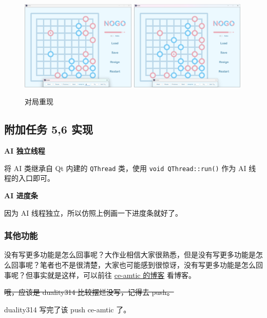 \documentclass{noithesis}
\begin{document}
	\begin{figure}[htbp]
		\centering
		
		\includegraphics[width=5.5cm]{img/review1.png}	
		\includegraphics[width=5.5cm]{img/review2.png}
		
		\caption{对局重现}
	\end{figure}

    \subsection{附加任务 5,6 实现}
    
    \textbf{AI 独立线程}
    
    将 AI 类继承自 Qt 内建的 \verb|QThread| 类，使用 \verb|void QThread::run()| 作为 AI 线程的入口即可。
    
    \textbf{AI 进度条}
    
    因为 AI 线程独立，所以仿照上例画一下进度条就好了。

	\subsubsection{其他功能}
	
	没有写更多功能是怎么回事呢？大作业相信大家很熟悉，但是没有写更多功能是怎么回事呢？笔者也不是很清楚，大家也可能感到很惊讶，没有写更多功能是怎么回事呢？但事实就是这样，可以前往 \href{https://ce-amtic.github.io/}{ce-amtic 的博客} 看博客。
	
	\sout{哦，应该是 duality314 比较摆烂没写，记得去 push。}
	
	duality314 写完了该 push ce-amtic 了。
	
\end{document}

